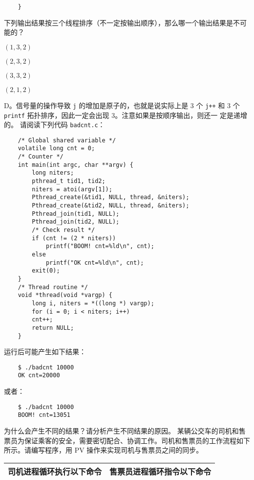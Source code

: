 \begin{problems}
\begin{verbatim}
    }
        \end{verbatim}
        下列输出结果按三个线程排序（不一定按输出顺序），那么哪一个输出结果是不可能的？
        \begin{choices}
            \item $(1, 3, 2)$
            \item $(2, 3, 2)$
            \item $(3, 3, 2)$
            \item $(2, 1, 2)$
        \end{choices}
        \sol D。信号量的操作导致 \verb|j| 的增加是原子的，也就是说实际上是 3 个 \verb|j++| 和 3 个 \verb|printf| 拓扑排序，因此一定会出现 3。注意如果是按顺序输出，则还一
        定是递增的。
         请阅读下列代码 \verb|badcnt.c|：
        \begin{verbatim}
    /* Global shared variable */
    volatile long cnt = 0;
    /* Counter */
    int main(int argc, char **argv) {
        long niters;
        pthread_t tid1, tid2;
        niters = atoi(argv[1]);
        Pthread_create(&tid1, NULL, thread, &niters);
        Pthread_create(&tid2, NULL, thread, &niters);
        Pthread_join(tid1, NULL);
        Pthread_join(tid2, NULL);
        /* Check result */
        if (cnt != (2 * niters))
            printf("BOOM! cnt=%ld\n", cnt);
        else
            printf("OK cnt=%ld\n", cnt);
        exit(0);
    }
    /* Thread routine */
    void *thread(void *vargp) {
        long i, niters = *((long *) vargp);
        for (i = 0; i < niters; i++)
        cnt++;
        return NULL;
    }
        \end{verbatim}
        运行后可能产生如下结果：
        \begin{verbatim}
    $ ./badcnt 10000
    OK cnt=20000
        \end{verbatim}
        或者：
        \begin{verbatim}
    $ ./badcnt 10000
    BOOM! cnt=13051
        \end{verbatim}
        为什么会产生不同的结果？请分析产生不同结果的原因。
         某辆公交车的司机和售票员为保证乘客的安全，需要密切配合、协调工作。司机和售票员的工作流程如下所示。请编写程序，用 PV 操作来实现司机与售票员之间的同步。
        \begin{table}[H]
            \centering
            \begin{tabular}{|c|c|}
                \hline
                司机进程循环执行以下命令 & 售票员进程循环指令以下命令 \\ \hline

\end{tabular}
\end{table}
\end{problems}
